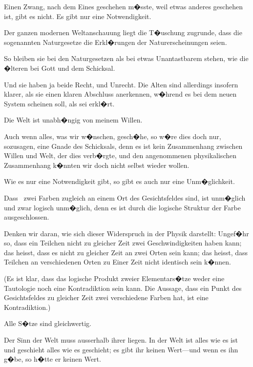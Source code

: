 \begin{propositions}
{Einen Zwang, nach dem Eines geschehen m�sste,
weil etwas anderes geschehen ist, gibt es nicht. Es
gibt nur eine  Notwendigkeit.}


{Der ganzen modernen Weltanschauung liegt die
T�uschung zugrunde, dass die sogenannten Naturgesetze
die Erkl�rungen der Naturerscheinungen
seien.}


{So bleiben sie bei den Naturgesetzen als bei
etwas Unantastbarem stehen, wie die �lteren bei
Gott und dem Schicksal.

Und sie haben ja beide Recht, und Unrecht. Die
Alten sind allerdings insofern klarer, als sie einen
klaren Abschluss anerkennen, w�hrend es bei dem
neuen System scheinen soll, als sei  erkl�rt.}


{Die Welt ist unabh�ngig von meinem Willen.}


{Auch wenn alles, was wir w�nschen, gesch�he,
so w�re dies doch nur, sozusagen, eine Gnade des
Schicksals, denn es ist kein  Zusammenhang
zwischen Willen und Welt, der dies
verb�rgte, und den angenommenen physikalischen
Zusammenhang k�nnten wir doch nicht selbst
wieder wollen.}


{Wie es nur eine  Notwendigkeit gibt,
so gibt es auch nur eine  Unm�glichkeit.}


{Dass \zumBeispiel\ zwei Farben zugleich an einem Ort
des Gesichtsfeldes sind, ist unm�glich und zwar
logisch unm�glich, denn es ist durch die logische
Struktur der Farbe ausgeschlossen.

Denken wir daran, wie sich dieser Widerspruch
in der Physik darstellt: Ungef�hr so, dass ein
Teilchen nicht zu gleicher Zeit zwei Geschwindigkeiten
haben kann; das heisst, dass es nicht zu
gleicher Zeit an zwei Orten sein kann; das heisst,
dass Teilchen an verschiedenen Orten zu Einer Zeit
nicht identisch sein k�nnen.

(Es ist klar, dass das logische Produkt zweier
Elementars�tze weder eine Tautologie noch eine
Kontradiktion sein kann. Die Aussage, dass ein
Punkt des Gesichtsfeldes zu gleicher Zeit zwei
verschiedene Farben hat, ist eine Kontradiktion.)}


{Alle S�tze sind gleichwertig.}


{Der Sinn der Welt muss ausserhalb ihrer liegen.
In der Welt ist alles wie es ist und geschieht alles
wie es geschieht; es gibt  ihr keinen Wert---und
wenn es ihn g�be, so h�tte er keinen Wert.

}
\end{propositions}
